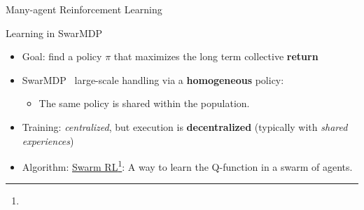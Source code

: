\documentclass[presentation, 8pt,169]{beamer}\mode<presentation>{\usetheme{AMSBolognaFC}}
\begin{document}
\begin{frame}{Many-agent Reinforcement Learning}
\begin{block}{Learning in SwarMDP}
\begin{itemize}
    \item Goal: find a policy $\pi$ that maximizes the long term collective \textbf{return}
    \item SwarMDP \faArrowRight \, large-scale handling via a \textbf{homogeneous} policy:
      \begin{itemize}
        \item The same policy is shared within the population.
      \end{itemize}
    \item Training: \emph{centralized}, but execution is \textbf{decentralized} (typically with \emph{shared experiences})
    \item Algorithm: \underline{Swarm RL}\footnote[frame]{}: A way to learn the Q-function in a swarm of agents.
  \end{itemize}
\end{block}

\end{frame}
\end{document}
